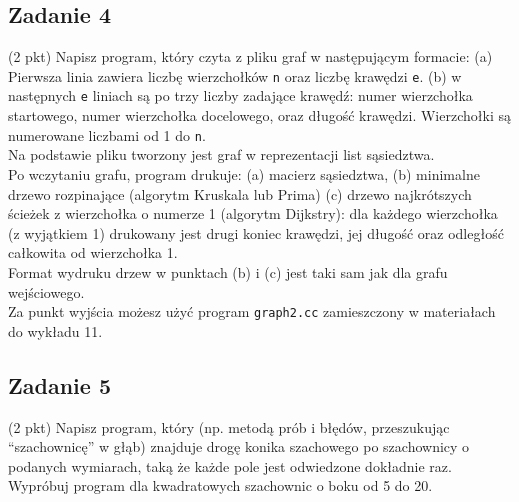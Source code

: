 \documentclass{article}
\begin{document}
\begin{enumerate}[label=(\alph*)]
\begin{center}
          \end{center}
\end{enumerate}

\subsection*{Zadanie 4}
(2 pkt) Napisz program, który czyta z pliku graf w następującym formacie:
(a) Pierwsza linia zawiera liczbę wierzchołków \verb|n| oraz liczbę krawędzi \verb|e|.
(b) w następnych \verb|e| liniach są po trzy liczby zadające krawędź: numer wierzchołka
startowego, numer wierzchołka docelowego, oraz długość krawędzi. Wierzchołki są numerowane liczbami od 1 do \verb|n|. \\[1em]
Na podstawie pliku tworzony jest graf w reprezentacji list sąsiedztwa. \\[1em]
Po wczytaniu grafu, program drukuje:
(a) macierz sąsiedztwa,
(b) minimalne drzewo rozpinające (algorytm Kruskala lub Prima)
(c) drzewo najkrótszych ścieżek z wierzchołka o numerze 1 (algorytm Dijkstry): dla
każdego wierzchołka (z wyjątkiem 1) drukowany jest drugi koniec krawędzi, jej długość
oraz odległość całkowita od wierzchołka 1. \\[1em]
Format wydruku drzew w punktach (b) i (c) jest taki sam jak dla grafu wejściowego. \\[1em]
Za punkt wyjścia możesz użyć program \verb|graph2.cc| zamieszczony w materiałach do wykładu 11.

\subsection*{Zadanie 5}
(2 pkt) Napisz program, który (np. metodą prób i błędów, przeszukując “szachownicę” w
głąb) znajduje drogę konika szachowego po szachownicy o podanych wymiarach, taką
że każde pole jest odwiedzone dokładnie raz. Wypróbuj program dla kwadratowych szachownic o boku od 5 do 20.
\end{document}
